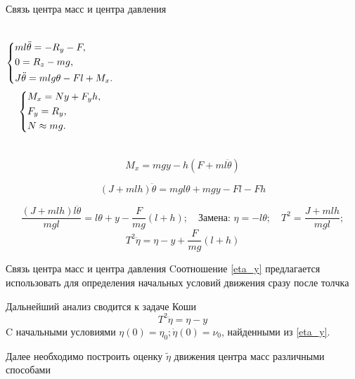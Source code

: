 \documentclass[10pt]{beamer}
\begin{document}
\begin{frame}{Связь центра масс и центра давления}
	\begin{columns}
	\begin{equation}\label{koshisystem}
    \left\{ {\begin{aligned}
                 & ml\ddot{\theta} = -R_y-F , \hfill   \\
                 & 0=R_z-mg, \hfill \\
                 & J \ddot{\theta} = mlg\theta-Fl+M_x . \hfill             \\
            \end{aligned}} \right.
\end{equation}
	\begin{equation}\label{koshisystem}
		\left\{ {\begin{aligned}
					 & M_x = Ny+F_yh , \hfill   \\
					 & F_y = R_y , \hfill \\
					 & N \approx mg . \hfill             \\
				\end{aligned}} \right.
	\end{equation}
\end{columns}

	$$M_x=mgy-h\left(F+ml\ddot{\theta}\right)$$

	$$\left(J+mlh\right)\ddot{\theta}=mgl\theta+mgy-Fl-Fh$$ 


 	$$\frac{(J+mlh)l\ddot{\theta}}{mgl}=l\theta+y-\frac{F}{mg}(l+h);\quad \text{Замена: }\eta=-l\theta; \quad T^2=\frac{J+mlh}{mgl};$$
\begin{equation}\label{eta_y}
	T^2\ddot{\eta}=\eta-y+\frac{F}{mg}(l+h)
\end{equation}

\end{frame}

\begin{frame}{Связь центра масс и центра давления}
	Cоотношение \eqref{eta_y} предлагается использовать для определения начальных условий движения сразу после толчка

	Дальнейший анализ сводится к задаче Коши
	\begin{equation}\label{eta_y_easy}
		T^2\ddot{\eta}=\eta-y
	\end{equation}
	C начальными условиями $\eta(0)=\eta_0; \dot{\eta}(0)=\nu_0$, найденными из \eqref{eta_y}.

	Далее необходимо построить оценку $\tilde\eta$ движения центра масс различными способами
\end{frame}
\end{document}
